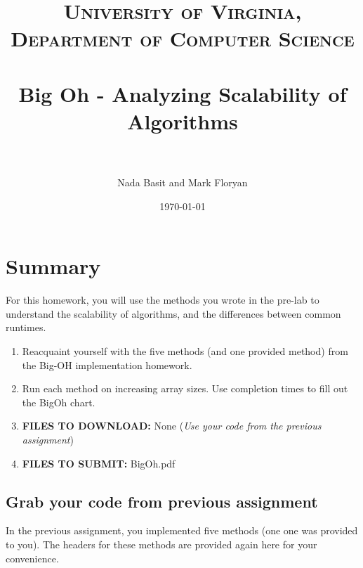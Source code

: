 \documentclass[paper=a4, fontsize=11pt, parskip=full]{scrartcl} %
\title{
\normalfont \normalsize
\textsc{University of Virginia, Department of Computer Science} \\ [25pt] %
\horrule{0.5pt} \\[0.4cm] %
\huge Big Oh - Analyzing Scalability of Algorithms \\ %
\horrule{2pt} \\[0.5cm] %
}
\author{Nada Basit and Mark Floryan}
\date{\normalsize\today} %
\numberwithin{equation}{section} %
\numberwithin{figure}{section} %
\numberwithin{table}{section} %
\begin{document}
\maketitle %


\section{Summary}

For this homework, you will use the methods you wrote in the pre-lab to understand the scalability of algorithms, and the differences between common runtimes.

\begin{enumerate}
	\item Reacquaint yourself with the five methods (and one provided method) from the Big-OH implementation homework.
	\item Run each method on increasing array sizes. Use completion times to fill out the BigOh chart.
	\item \textbf{FILES TO DOWNLOAD:} None (\emph{Use your code from the previous assignment})
	\item \textbf{FILES TO SUBMIT:} BigOh.pdf
\end{enumerate}


\subsection{Grab your code from previous assignment}

In the previous assignment, you implemented five methods (one one was provided to you). The headers for these methods are provided again here for your convenience.
\end{document}
